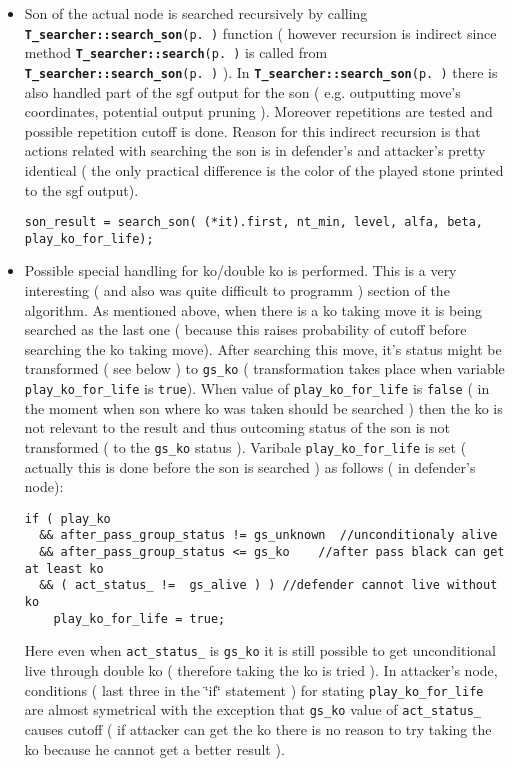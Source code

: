 \begin{itemize}
\item Son of the actual node is searched recursively by calling {\tt {\bf T\_\-searcher::search\_\-son}{\rm (p.\,\pageref{classT__searcher_a11})}} function ( however recursion is indirect since method {\tt {\bf T\_\-searcher::search}{\rm (p.\,\pageref{classT__searcher_a0})}} is called from {\tt {\bf T\_\-searcher::search\_\-son}{\rm (p.\,\pageref{classT__searcher_a11})}} ). In {\tt {\bf T\_\-searcher::search\_\-son}{\rm (p.\,\pageref{classT__searcher_a11})}} there is also handled part of the sgf output for the son ( e.g. outputting move's coordinates, potential output pruning ). Moreover repetitions are tested and possible repetition cutoff is done. Reason for this indirect recursion is that actions related with searching the son is in defender's and attacker's pretty identical ( the only practical difference is the color of the played stone printed to the sgf output). 

\footnotesize\begin{verbatim}son_result = search_son( (*it).first, nt_min, level, alfa, beta, play_ko_for_life);
\end{verbatim}
\normalsize
\end{itemize}


\begin{itemize}
\item Possible special handling for ko/double ko is performed. This is a very interesting ( and also was quite difficult to programm ) section of the algorithm. As mentioned above, when there is a ko taking move it is being searched as the last one ( because this raises probability of cutoff before searching the ko taking move). After searching this move, it's status might be transformed ( see below ) to {\tt gs\_\-ko} ( transformation takes place when variable {\tt play\_\-ko\_\-for\_\-life} is {\tt true}). When value of {\tt play\_\-ko\_\-for\_\-life} is {\tt false} ( in the moment when son where ko was taken should be searched ) then the ko is not relevant to the result and thus outcoming status of the son is not transformed ( to the {\tt gs\_\-ko} status ). Varibale {\tt play\_\-ko\_\-for\_\-life} is set ( actually this is done before the son is searched ) as follows ( in defender's node): 

\footnotesize\begin{verbatim}if ( play_ko 
  && after_pass_group_status != gs_unknown  //unconditionaly alive
  && after_pass_group_status <= gs_ko    //after pass black can get at least ko
  && ( act_status_ !=  gs_alive ) ) //defender cannot live without ko 
    play_ko_for_life = true;
\end{verbatim}
\normalsize
 Here even when {\tt act\_\-status\_\-} is {\tt gs\_\-ko} it is still possible to get unconditional live through double ko ( therefore taking the ko is tried ). In attacker's node, conditions ( last three in the \char`\"{}if\char`\"{} statement ) for stating {\tt play\_\-ko\_\-for\_\-life} are almost symetrical with the exception that {\tt gs\_\-ko} value of {\tt act\_\-status\_\-} causes cutoff ( if attacker can get the ko there is no reason to try taking the ko because he cannot get a better result ).\end{itemize}



